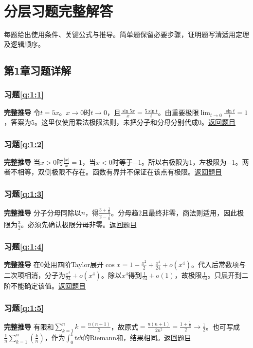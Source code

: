 \chapter{分层习题完整解答}\label{app:answers}

每题给出使用条件、关键公式与推导。简单题保留必要步骤，证明题写清适用定理及逻辑顺序。

\section{第1章习题详解}

\subsection*{习题\ref{q:1:1}}\label{a:1:1}\textbf{完整推导} 令$t=5x$。$x\to0$时$t\to0$，且$\frac{\sin5x}{x}=\frac{5\sin t}{t}$。由重要极限$\lim_{t\to0}\frac{\sin t}{t}=1$，答案为5。这里仅使用乘法极限法则，未把分子和分母分别代成0。\quad\hyperref[q:1:1]{返回题目}

\subsection*{习题\ref{q:1:2}}\label{a:1:2}\textbf{完整推导} 当$x>0$时$\frac{|x|}{x}=1$，当$x<0$时等于$-1$。所以右极限为1，左极限为$-1$。两者不相等，双侧极限不存在。函数有界并不保证在该点有极限。\quad\hyperref[q:1:2]{返回题目}

\subsection*{习题\ref{q:1:3}}\label{a:1:3}\textbf{完整推导} 分子分母同除以$n$，得$\frac{3+\frac{1}{n}}{2-\frac{1}{n}}$。分母趋2且最终非零，商法则适用，因此极限为$\frac{3}{2}$。必须先确认极限分母非零。\quad\hyperref[q:1:3]{返回题目}

\subsection*{习题\ref{q:1:4}}\label{a:1:4}\textbf{完整推导} 在0处用四阶Taylor展开$\cos x=1-\frac{x^2}{2}+\frac{x^4}{24}+o(x^4)$。代入后常数项与二次项相消，分子为$\frac{x^4}{24}+o(x^4)$。除以$x^4$得到$\frac{1}{24}+o(1)$，故极限$\frac{1}{24}$。只展开到二阶不能确定该值。\quad\hyperref[q:1:4]{返回题目}

\subsection*{习题\ref{q:1:5}}\label{a:1:5}\textbf{完整推导} 有限和$\sum_{k=1}^nk=\frac{n(n+1)}{2}$，故原式$=\frac{n(n+1)}{2n^2}=\frac{1+\frac{1}{n}}{2}\to\frac{1}{2}$。也可写成$\frac1n\sum_{k=1}^n(\frac{k}{n})$，作为$\int_0^1t\dd t$的Riemann和，结果相同。\quad\hyperref[q:1:5]{返回题目}

